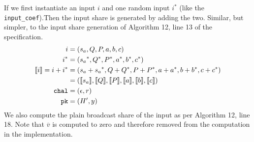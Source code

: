 \documentclass[twoside,11pt]{report}
\theoremstyle{definition}
\theoremstyle{plain}
\begin{document}
If we first instantiate an input $i$ and one random input $i^*$ (like the \texttt{input\_coef}).Then the input share is generated by adding the two. Similar, but simpler, to the input share generation of Algorithm 12, line 13 of the specification.
\begin{align*}
  i                & = (s_a, Q, P, a,b,c)                                             \\
  i^*              & = ({s_a}^*, Q^*, P^*, a^*,b^*,c^*)                               \\
  \llbracket i \rrbracket = i + i^* & = ({s_a} + {s_a}^*, Q + Q^*, P + P^*, a + a^*, b + b^*, c + c^*) \\
                   & = (\llbracket s_a \rrbracket, \llbracket Q \rrbracket, \llbracket P \rrbracket, \llbracket a \rrbracket, \llbracket b \rrbracket, \llbracket c \rrbracket)             \\
  \texttt{chal}    & = (\epsilon, r)                                                  \\
  \texttt{pk}      & = (H', y)
\end{align*}
We also compute the plain broadcast share of the input as per Algorithm 12, line 18. Note that $\overline{v}$ is computed to zero and therefore removed from the computation in the implementation.
\end{document}
